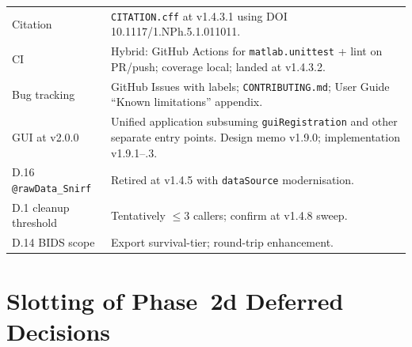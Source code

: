 \documentclass[11pt,a4paper]{article}
\begin{document}
\begin{longtable}{p{3.5cm}p{10.5cm}}
Citation & \texttt{CITATION.cff} at v1.4.3.1 using DOI 10.1117/1.NPh.5.1.011011. \\
CI & Hybrid: GitHub Actions for \texttt{matlab.unittest} + lint on PR/push; coverage local; landed at v1.4.3.2. \\
Bug tracking & GitHub Issues with labels; \texttt{CONTRIBUTING.md}; User Guide ``Known limitations'' appendix. \\
GUI at v2.0.0 & Unified application subsuming \texttt{guiRegistration} and other separate entry points. Design memo v1.9.0; implementation v1.9.1--.3. \\
D.16 \texttt{@rawData\_Snirf} & Retired at v1.4.5 with \texttt{dataSource} modernisation. \\
D.1 cleanup threshold & Tentatively $\leq 3$ callers; confirm at v1.4.8 sweep. \\
D.14 BIDS scope & Export survival-tier; round-trip enhancement. \\
\bottomrule
\end{longtable}

\section{Slotting of Phase~2d Deferred Decisions}
\end{document}
